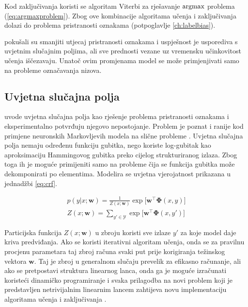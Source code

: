Kod zaključivanja koristi se algoritam Viterbi za rješavanje $\operatorname*{argmax}$ problema
(\ref{eq:argmaxproblem}). Zbog ove kombinacije algoritama učenja i zaključivanja
dolazi do problema pristranosti oznakama (potpoglavlje \ref{ch:labelbias}).

\cite{cohen05ijcai} pokušali su smanjiti utjecaj pristranosti oznakama i
uspješnost je usporediva s uvjetnim slučajnim poljima, ali sve prednosti vezane
uz vremensku učinkovitost učenja iščezavaju. Unatoč ovim promjenama model se
može primjenjivati samo na probleme označavanja nizova.


\subsection{Uvjetna slučajna polja}

\citet*{lafferty2001conditional} uvode uvjetna slučajna polja kao rješenje
problema pristranosti oznakama i eksperimentalno potvrđuju njegovo nepostojanje.
Problem je poznat i ranije kod primjene neuronskih Markovljevih modela na slične
probleme \citep{leon1991approche}. Uvjetna slučajna polja nemaju određenu
funkciju gubitka, nego koriste log-gubitak kao aproksimaciju Hammingovog gubitka
preko cijelog strukturiranog izlaza. Zbog toga ih je moguće primijeniti samo na
probleme čija se funkcija gubitka može dekomponirati po elementima. Modelira se
uvjetna vjerojatnost prikazana u jednadžbi \ref{eq:crf}.

\begin{equation}\label{eq:crf}
\begin{aligned}
  p(y | x; \mathbf{w}) = \frac{1}{Z(x; \mathbf{w})} \exp \big[ \mathbf{w}^\top \mathbf{\Phi}(x, y)\big] \\
  Z(x; \mathbf{w}) = \sum_{y' \in \mathcal{Y}} \exp \big[ \mathbf{w}^\top \mathbf{\Phi}(x, y')\big]
\end{aligned}
\end{equation}

\noindent
Particijska funkcija $Z(x; \mathbf{w})$ u zbroju koristi sve izlaze $y'$ za koje
model daje kriva predviđanja. Ako se koristi iterativni algoritam učenja, onda
se za pravilnu procjenu parametara taj zbroj računa svaki put prije korigiranja
težinskog vektora $\mathbf{w}$. Taj je zbroj u generalnom slučaju prevelik za
efikasno računanje, ali ako se pretpostavi struktura linearnog lanca, onda ga je
moguće izračunati koristeći dinamičko programiranje i svaka prilagodba na novi
problem koji je predstavljen netrivijalnim linearnim lancem zahtijeva novu
implementaciju algoritama učenja i zaključivanja \citep{lafferty2001conditional,
sha2003shallow}.

